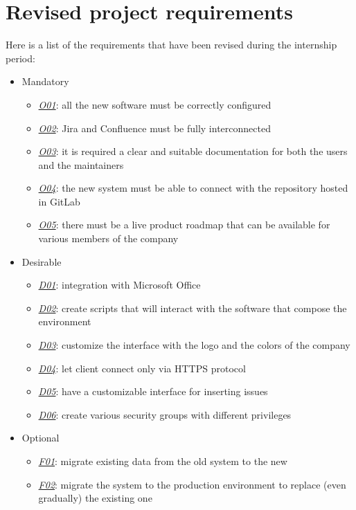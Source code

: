 \newpage
\section{Revised project requirements}
	Here is a list of the requirements that have been revised during the internship period:
	\begin{itemize}
		\item Mandatory
		\begin{itemize}
			\item \underline{\textit{O01}}: all the new software must be correctly configured
			\item \underline{\textit{O02}}: Jira and Confluence must be fully interconnected
			\item \underline{\textit{O03}}: it is required a clear and suitable documentation for both the users and the maintainers
			\item \underline{\textit{O04}}: the new system must be able to connect with the repository hosted in GitLab
			\item \underline{\textit{O05}}: there must be a live product roadmap that can be available for various members of the company
		\end{itemize}
		\item Desirable
		\begin{itemize}
			\item \underline{\textit{D01}}: integration with Microsoft Office
			\item \underline{\textit{D02}}: create scripts that will interact with the software that compose the environment
			\item \underline{\textit{D03}}: customize the interface with the logo and the colors of the company
			\item \underline{\textit{D04}}: let client connect only via HTTPS protocol
			\item \underline{\textit{D05}}: have a customizable interface for inserting issues
			\item \underline{\textit{D06}}: create various security groups with different privileges
		\end{itemize}
		\item Optional
		\begin{itemize}
			\item \underline{\textit{F01}}: migrate existing data from the old system to the new
			\item \underline{\textit{F02}}: migrate the system to the production environment to replace (even gradually) the existing one
		\end{itemize} 
	\end{itemize}